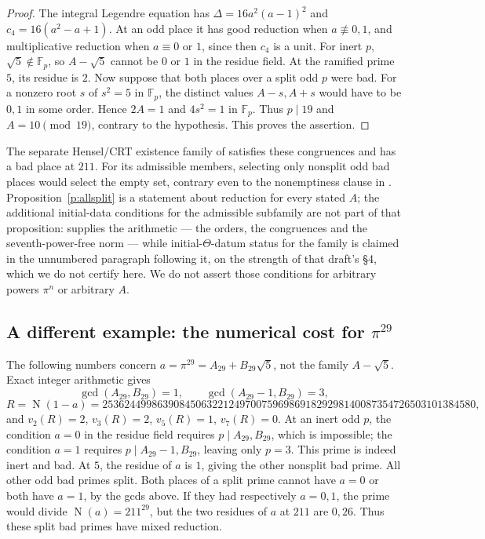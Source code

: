 \documentclass[11pt]{article}
\theoremstyle{plain}
\theoremstyle{definition}
\newcommand{\Norm}{\operatorname{N}}
\begin{document}
\begin{proof}
The integral Legendre equation has
$\Delta=16a^2(a-1)^2$ and $c_4=16(a^2-a+1)$.  At an odd place it has good
reduction when $a\not\equiv0,1$, and multiplicative reduction when
$a\equiv0$ or $1$, since then $c_4$ is a unit.
For inert $p$, $\sqrt5\notin\mathbb F_p$, so $A-\sqrt5$ cannot be $0$ or $1$
in the residue field.  At the ramified prime $5$, its residue is $2$.
Now suppose that both places over a split odd $p$ were bad.  For a nonzero
root $s$ of $s^2=5$ in $\mathbb F_p$, the distinct values $A-s,A+s$ would
have to be $0,1$ in some order.  Hence $2A=1$ and $4s^2=1$ in
$\mathbb F_p$.  Thus $p\mid19$ and $A=10\pmod{19}$, contrary to the
hypothesis.  This proves the assertion.
\end{proof}

The separate Hensel/CRT existence family of \cite[Prop.~9.4]{Firstfull}
satisfies these congruences and has a bad place at $211$.  For its admissible
members, selecting only nonsplit odd bad places would select the empty set,
contrary even to the nonemptiness clause in \cite[Definition 3.1]{IUT1}.
Proposition~\ref{p:allsplit} is a statement about reduction for every stated
$A$; the additional initial-data conditions for the admissible subfamily
are not part of that proposition: \cite[Prop.~9.4]{Firstfull} supplies the arithmetic
--- the orders, the congruences and the seventh-power-free norm --- while
initial-$\Theta$-datum status for the family is claimed in the unnumbered paragraph
following it, on the strength of that draft's \S4, which we do not certify here.
We do not assert those
conditions for arbitrary powers $\pi^n$ or arbitrary $A$.

\subsection*{A different example: the numerical cost for $\pi^{29}$}

The following numbers concern $a=\pi^{29}=A_{29}+B_{29}\sqrt5$, not the
family $A-\sqrt5$.  Exact integer arithmetic gives
\[
 \gcd(A_{29},B_{29})=1,\qquad \gcd(A_{29}-1,B_{29})=3,
\]
\[
 R=\Norm(1-a)
 =25362449986390845063221249700759698691829298140087354726503101384580,
\]
and $v_2(R)=2$, $v_3(R)=2$, $v_5(R)=1$, $v_7(R)=0$.
At an inert odd $p$, the condition $a=0$ in the residue field requires
$p\mid A_{29},B_{29}$, which is impossible; the condition $a=1$ requires
$p\mid A_{29}-1,B_{29}$, leaving only $p=3$.  This prime is indeed inert and
bad.  At $5$, the residue of $a$ is $1$, giving the other nonsplit bad prime.
All other odd bad primes split.  Both places of a split prime cannot have
$a=0$ or both have $a=1$, by the gcds above.  If they had respectively
$a=0,1$, the prime would divide $\Norm(a)=211^{29}$, but the two residues
of $a$ at $211$ are $0,26$.  Thus these split bad primes have mixed reduction.
\end{document}
